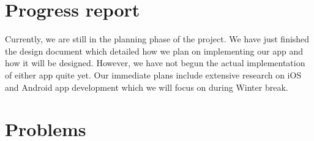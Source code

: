 \documentclass[letterpaper,10pt,draftclsnofoot,onecolumn,titlepage]{IEEEtran}
\begin{document}
		\section{Progress report}
		Currently, we are still in the planning phase of the project. 
		We have just finished the design document which detailed how we plan on implementing our app and how it will be designed. 
		However, we have not begun the actual implementation of either app quite yet. 
		Our immediate plans include extensive research on iOS and Android app development which we will focus on during Winter break. 
		

		\section{Problems}
\end{document}
